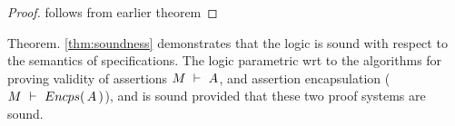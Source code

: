 \begin{proof}
follows from earlier theorem
\end{proof}
 


Theorem. \ref{thm:soundness} demonstrates 
 that the   \SpecLang logic is sound with respect to the semantics of \SpecLang specifications.
 The \SpecLang logic parametric wrt to the algorithms for proving validity of assertions
 $M\ \vdash\ A$, and 
 assertion encapsulation ($M\ \vdash\ {Encps(\, A\, )}$), and is sound
 provided that these two proof systems are sound.

